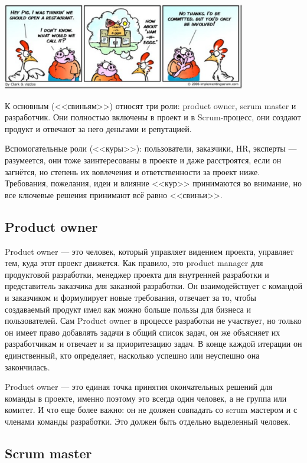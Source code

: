 \documentclass{../../text-style}
\begin{document}
\begin{center}
    \includegraphics[width=0.8\textwidth]{chickenAndPig.png}
\end{center}

К основным (<<свиньям>>) относят три роли: product owner, scrum master и разработчик. Они полностью включены в проект и в Scrum-процесс, они создают продукт и отвечают за него деньгами и репутацией.

Вспомогательные роли (<<куры>>): пользователи, заказчики, HR, эксперты --- разумеется, они тоже заинтересованы в проекте и даже расстроятся, если он загнётся, но степень их вовлечения и ответственности за проект ниже. Требования, пожелания, идеи и влияние <<кур>> принимаются во внимание, но все ключевые решения принимают всё равно <<свиньи>>.

\subsection{Product owner}

Product owner --- это человек, который управляет видением проекта, управляет тем, куда этот проект движется. Как правило, это product manager для продуктовой разработки, менеджер проекта для внутренней разработки и представитель заказчика для заказной разработки. Он взаимодействует с командой и заказчиком и формулирует новые требования, отвечает за то, чтобы создаваемый продукт имел как можно больше пользы для бизнеса и пользователей. Сам Product owner в процессе разработки не участвует, но только он имеет право добавлять задачи в общий список задач, он же объясняет их разработчикам и отвечает и за приоритезацию задач. В конце каждой итерации он единственный, кто определяет, насколько успешно или неуспешно она закончилась.

Product owner --- это единая точка принятия окончательных решений для команды в проекте, именно поэтому это всегда один человек, а не группа или комитет. И что еще более важно: он не должен совпадать со scrum мастером и с членами команды разработки. Это должен быть отдельно выделенный человек.

\subsection{Scrum master}
\end{document}
